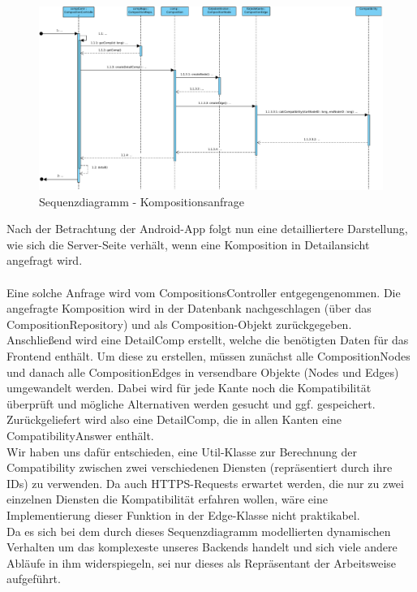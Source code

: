 \begin{figure}[h]
	\centering
	\includegraphics[width=\textwidth]{img/Diagramme/Sequenz/Controller}	
	\caption{Sequenzdiagramm - Kompositionsanfrage}
	\label{fig:sequenz-a}
\end{figure}
\noindent
Nach der Betrachtung der Android-App folgt nun eine detailliertere Darstellung, wie sich die Server-Seite verhält, wenn eine Komposition in Detailansicht angefragt wird.\\ \\ 
\noindent Eine solche Anfrage wird vom CompositionsController entgegengenommen.
Die angefragte Komposition wird in der Datenbank nachgeschlagen (über das CompositionRepository) und als Composition-Objekt zurückgegeben.
Anschließend wird eine DetailComp erstellt, welche die benötigten Daten für das Frontend enthält. 
Um diese zu erstellen, müssen zunächst alle CompositionNodes und danach alle CompositionEdges in versendbare Objekte (Nodes und Edges) umgewandelt werden. 
Dabei wird für jede Kante noch die Kompatibilität überprüft und mögliche Alternativen werden gesucht und ggf. gespeichert. Zurückgeliefert wird also eine DetailComp, die in allen Kanten eine CompatibilityAnswer enthält.\newline
\\ \noindent
Wir haben uns dafür entschieden, eine Util-Klasse zur Berechnung der Compatibility zwischen zwei verschiedenen Diensten (repräsentiert durch ihre IDs) zu verwenden.
Da auch HTTPS-Requests erwartet werden, die nur zu zwei einzelnen Diensten die Kompatibilität erfahren wollen, wäre eine Implementierung dieser Funktion in der Edge-Klasse nicht praktikabel.\newline
\\ \noindent
Da es sich bei dem durch dieses Sequenzdiagramm modellierten dynamischen Verhalten um das komplexeste unseres Backends handelt und sich viele andere Abläufe in ihm widerspiegeln, sei nur dieses als Repräsentant der Arbeitsweise aufgeführt.


